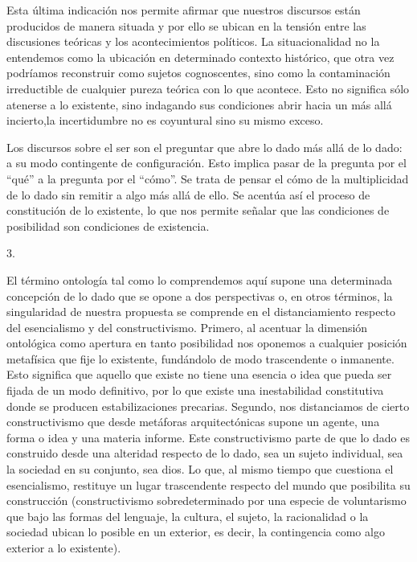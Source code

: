 Esta última indicación nos permite afirmar que nuestros discursos están producidos de manera situada y por ello se ubican en la tensión entre las discusiones teóricas y los acontecimientos políticos. La situacionalidad no la entendemos como la ubicación en determinado contexto histórico, que otra vez podríamos reconstruir como sujetos cognoscentes, sino como la contaminación irreductible de cualquier pureza teórica con lo que acontece. Esto no significa sólo atenerse a lo existente, sino indagando sus condiciones abrir hacia un más allá incierto,la incertidumbre no es coyuntural sino su mismo exceso.

Los discursos sobre el ser son el preguntar que abre lo dado más allá de lo dado: a su modo contingente de configuración. Esto implica pasar de la pregunta por el \enquote{qué} a la pregunta por el \enquote{cómo}. Se trata de pensar el cómo de la multiplicidad de lo dado sin remitir a algo más allá de ello. Se acentúa así el proceso de constitución de lo existente, lo que nos permite señalar que las condiciones de posibilidad son condiciones de existencia.

3.

El término ontología tal como lo comprendemos aquí supone una determinada concepción de lo dado que se opone a dos perspectivas o, en otros términos, la singularidad de nuestra propuesta se comprende en el distanciamiento respecto del esencialismo y del constructivismo. Primero, al acentuar la dimensión ontológica como apertura en tanto posibilidad nos oponemos a cualquier posición metafísica que fije lo existente, fundándolo de modo trascendente o inmanente. Esto significa que aquello que existe no tiene una esencia o idea que pueda ser fijada de un modo definitivo, por lo que existe una inestabilidad constitutiva donde se producen estabilizaciones precarias. Segundo, nos distanciamos de cierto constructivismo que desde metáforas arquitectónicas supone un agente, una forma o idea y una materia informe. Este constructivismo parte de que lo dado es construido desde una alteridad respecto de lo dado, sea un sujeto individual, sea la sociedad en su conjunto, sea dios. Lo que, al mismo tiempo que cuestiona el esencialismo, restituye un lugar trascendente respecto del mundo que posibilita su construcción (constructivismo sobredeterminado por una especie de voluntarismo que bajo las formas del lenguaje, la cultura, el sujeto, la racionalidad o la sociedad ubican lo posible en un exterior, es decir, la contingencia como algo exterior a lo existente).

